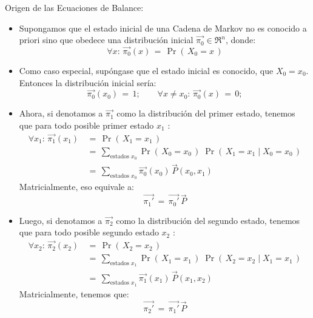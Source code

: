 \documentclass[ 10pt, xcolor = dvipsnames]{beamer}
\begin{document}
\begin{frame}[allowframebreaks]
\frametitle{\insertsubsection}

Origen de las Ecuaciones de Balance: 
\begin{itemize}
\item Supongamos que el estado inicial de una Cadena de Markov no es conocido \linebreak a priori sino que obedece una distribuci\'on inicial $\vec{\pi_0} \in \Re^n$, donde: 
\[
\forall x \colon \, \vec{\pi_0}(x) \, = \, \Pr( \, X_0 = x \, )
\]
\item Como caso especial, sup\'ongase que el estado inicial es conocido, \eg \linebreak que $X_0 = x_0$. Entonces la distribuci\'on inicial ser\'ia: 
\[
\vec{\pi_0}(x_0) \, = \, 1; \qquad
\forall x \neq x_0 \colon \, \vec{\pi_0}(x) \, = \, 0;
\]
\end{itemize}
\framebreak

\begin{itemize}
\item Ahora, si denotamos a $\vec{\pi_1}$ como la distribuci\'on del primer estado, \linebreak tenemos que para todo posible primer estado $x_1$ :
\begin{align*}
\forall x_1 \colon \, \vec{\pi_1}(x_1) \, 
& = \, \Pr( \, X_1 = x_1 \, ) \\[1ex]
& = \, \sum_{\text{estados } x_0} \Pr( \, X_0 = x_0 \, ) \; \Pr( \, X_1 = x_1 \mid X_0 = x_0 \, ) \\[1ex]
& = \, \sum_{\text{estados } x_0} \vec{\pi_0}(x_0) \, \vec{P}(x_0,x_1)
\end{align*}
Matricialmente, eso equivale a: 
\[
\vec{\pi_1'} \, = \, \vec{\pi_0'} \, \vec{P}
\]
\end{itemize}
\framebreak

\begin{itemize}
\item Luego, si denotamos a $\vec{\pi_2}$ como la distribuci\'on del segundo estado, \linebreak tenemos que para todo posible segundo estado $x_2$ :
\begin{align*}
\forall x_2 \colon \, \vec{\pi_2}(x_2) \,
& = \, \Pr( \, X_2 = x_2 \, ) \\[1ex]
& = \, \sum_{\text{estados } x_1} \Pr( \, X_1 = x_1 \, ) \; \Pr( \, X_2 = x_2 \mid X_1 = x_1 \, ) \\[1ex]
& = \, \sum_{\text{estados } x_1} \vec{\pi_1}(x_1) \, \vec{P}(x_1,x_2)
\end{align*}
Matricialmente, tenemos que: 
\[
\vec{\pi_2'} \, = \, \vec{\pi_1'} \, \vec{P}
\]
\end{itemize}
\framebreak


\end{frame}
\end{document}
